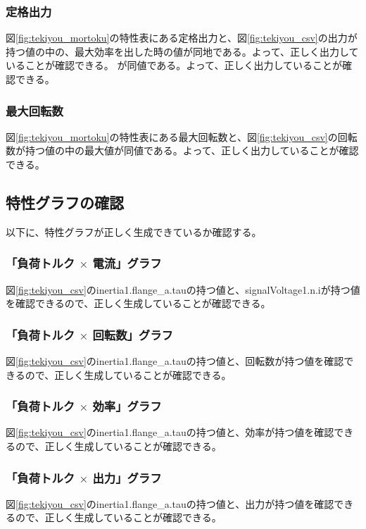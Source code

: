 \subsubsection{定格出力}
図\ref{fig:tekiyou_mortoku}の特性表にある定格出力と、図\ref{fig:tekiyou_csv}の出力が持つ値の中の、最大効率を出した時の値が同地である。よって、正しく出力していることが確認できる。
が同値である。よって、正しく出力していることが確認できる。
\subsubsection{最大回転数}
図\ref{fig:tekiyou_mortoku}の特性表にある最大回転数と、図\ref{fig:tekiyou_csv}の回転数が持つ値の中の最大値が同値である。よって、正しく出力していることが確認できる。
\subsection{特性グラフの確認}
以下に、特性グラフが正しく生成できているか確認する。

\subsubsection{「負荷トルク $\times$ 電流」グラフ}
図\ref{fig:tekiyou_csv}のinertia1.flange\_a.tauの持つ値と、signalVoltage1.n.iが持つ値を確認できるので、正しく生成していることが確認できる。
\subsubsection{「負荷トルク $\times$ 回転数」グラフ}
図\ref{fig:tekiyou_csv}のinertia1.flange\_a.tauの持つ値と、回転数が持つ値を確認できるので、正しく生成していることが確認できる。
\subsubsection{「負荷トルク $\times$ 効率」グラフ}
図\ref{fig:tekiyou_csv}のinertia1.flange\_a.tauの持つ値と、効率が持つ値を確認できるので、正しく生成していることが確認できる。
\subsubsection{「負荷トルク $\times$ 出力」グラフ}
図\ref{fig:tekiyou_csv}のinertia1.flange\_a.tauの持つ値と、出力が持つ値を確認できるので、正しく生成していることが確認できる。


